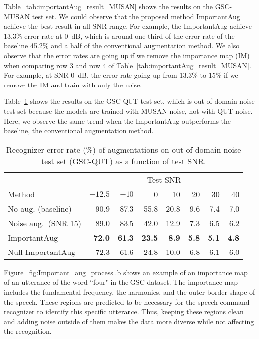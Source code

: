 \documentclass{article}
\begin{document}
Table~\ref{tab:importantAug_result_MUSAN} shows the results on the GSC-MUSAN test set. We could observe that the proposed method ImportantAug achieve the best result in all SNR range. For example, the ImportantAug achieve 13.3\% error rate at 0~dB, which is around one-third of the error rate of the baseline 45.2\% and a half of the conventional augmentation method. We also observe that the error rates are going up if we remove the importance map (IM) when comparing row 3 and row 4 of Table~\ref{tab:importantAug_result_MUSAN}. For example, at SNR 0~dB, the error rate going up from 13.3\% to 15\% if we remove the IM and train with only the noise.  


Table~\ref{tab:importantAug_result_QUT} shows the results on the GSC-QUT test set, which is out-of-domain noise test set because the models are trained with MUSAN noise, not with QUT noise. Here, we observe the same trend when the ImportantAug outperforms the baseline, the conventional augmentation method.

\begin{table}
  \caption{Recognizer error rate (\%) of augmentations on out-of-domain noise test set (GSC-QUT) as a function of test SNR.} \label{tab:importantAug_result_QUT}
  \begin{center}
     \scriptsize
    \begin{tabular}{lrrrrrrr}
    \toprule
    & \multicolumn{7}{c}{Test SNR} \\
     Method &  $-12.5$ &$-10$ &0 & 10 & 20 & 30 &40 \\
     \midrule
     No aug. (baseline) & 90.9 & 87.3 & 55.8 & 20.8 & 9.6 & 7.4 & 7.0  \\
       Noise aug.~(SNR 15) & 89.0 & 83.5 & 42.0 & 12.9 & 7.3 & 6.5 & 6.2   \\
        ImportantAug & \textbf{72.0} & \textbf{61.3} & \textbf{23.5} & \textbf{8.9} & \textbf{5.8} & \textbf{5.1} & \textbf{4.8}  \\
        Null ImportantAug & 72.3 & 61.6 & 24.8 & 10.0 & 6.8 & 6.1 & 6.0  \\
      \bottomrule
    \end{tabular}
  \end{center}
\end{table}
Figure~\ref{fig:Important_aug_process}.b shows an example of an importance map of an utterance of the word ``four" in the GSC dataset. The importance map includes the fundamental frequency, the harmonics, and the outer border shape of the speech. These regions are predicted to be necessary for the speech command recognizer to identify this specific utterance. Thus, keeping these regions clean and adding noise outside of them makes the data more diverse while not affecting the recognition. 
\end{document}
